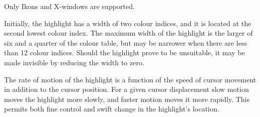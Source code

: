 \documentclass[twoside,11pt,nolof]{starlink}
\begin{document}
{{{         \sstitem
         Only Ikons and X-windows are supported.

         \sstitem
         Initially, the highlight has a width of two colour indices,
         and it is located at the second lowest colour index.  The maximum
         width of the highlight is the larger of six and a quarter of the
         colour table, but may be narrower when there are less than 12
         colour indices.  Should the highlight prove to be unsuitable, it
         may be made invisible by reducing the width to zero.

         \sstitem
         The rate of motion of the highlight is a function of the
         speed of cursor movement in addition to the cursor position.
         For a given cursor displacement slow motion moves the highlight
         more slowly, and faster motion moves it more rapidly.  This
         permits both fine control and swift change in the highlight's
         location.
      }
   }
}
\end{document}
